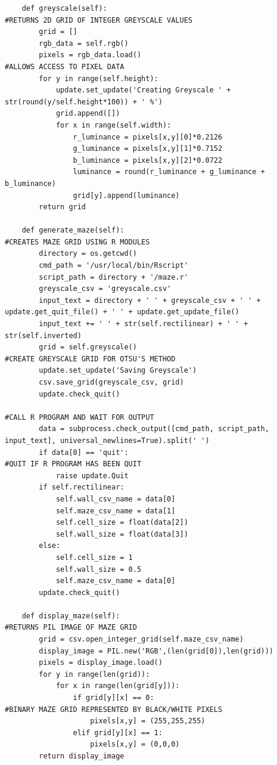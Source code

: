 \documentclass[titlepage]{article}
\begin{document}
\begin{changemargin}{-1in}{-1in}
\begin{verbatim}
    def greyscale(self):                                                        #RETURNS 2D GRID OF INTEGER GREYSCALE VALUES                                                      
        grid = []                                                               
        rgb_data = self.rgb()
        pixels = rgb_data.load()                                                #ALLOWS ACCESS TO PIXEL DATA
        for y in range(self.height):                                            
            update.set_update('Creating Greyscale ' + str(round(y/self.height*100)) + ' %')
            grid.append([])
            for x in range(self.width):
                r_luminance = pixels[x,y][0]*0.2126
                g_luminance = pixels[x,y][1]*0.7152
                b_luminance = pixels[x,y][2]*0.0722
                luminance = round(r_luminance + g_luminance + b_luminance)      
                grid[y].append(luminance)                                       
        return grid

    def generate_maze(self):                                                    #CREATES MAZE GRID USING R MODULES
        directory = os.getcwd()
        cmd_path = '/usr/local/bin/Rscript'
        script_path = directory + '/maze.r'
        greyscale_csv = 'greyscale.csv'  
        input_text = directory + ' ' + greyscale_csv + ' ' + update.get_quit_file() + ' ' + update.get_update_file()
        input_text += ' ' + str(self.rectilinear) + ' ' + str(self.inverted)
        grid = self.greyscale()                                                 #CREATE GREYSCALE GRID FOR OTSU'S METHOD
        update.set_update('Saving Greyscale')
        csv.save_grid(greyscale_csv, grid)        
        update.check_quit()
                                                                                #CALL R PROGRAM AND WAIT FOR OUTPUT
        data = subprocess.check_output([cmd_path, script_path, input_text], universal_newlines=True).split(' ')
        if data[0] == 'quit':                                                   #QUIT IF R PROGRAM HAS BEEN QUIT
            raise update.Quit
        if self.rectilinear:
            self.wall_csv_name = data[0]
            self.maze_csv_name = data[1]
            self.cell_size = float(data[2])
            self.wall_size = float(data[3])
        else:
            self.cell_size = 1
            self.wall_size = 0.5
            self.maze_csv_name = data[0]
        update.check_quit()

    def display_maze(self):                                                     #RETURNS PIL IMAGE OF MAZE GRID
        grid = csv.open_integer_grid(self.maze_csv_name)
        display_image = PIL.new('RGB',(len(grid[0]),len(grid)))
        pixels = display_image.load()
        for y in range(len(grid)):
            for x in range(len(grid[y])):
                if grid[y][x] == 0:                                             #BINARY MAZE GRID REPRESENTED BY BLACK/WHITE PIXELS
                    pixels[x,y] = (255,255,255)
                elif grid[y][x] == 1:
                    pixels[x,y] = (0,0,0)
        return display_image


\end{verbatim}
\end{changemargin}
\end{document}
